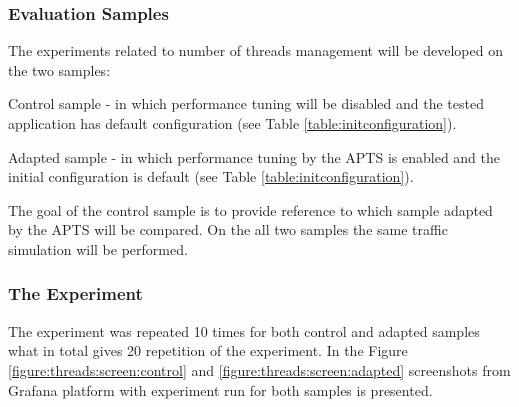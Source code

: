 \documentclass[12pt,a4paper]{article}
\let\tempone\itemize
\let\temptwo\enditemize
\renewenvironment{itemize}{\tempone\addtolength{\itemsep}{-0.4\baselineskip}}{\temptwo}
\begin{document}
 
\subsubsection{Evaluation Samples}

The experiments related to number of threads management will be developed on the two samples:
\begin{itemize}
\item Control sample - in which performance tuning will be disabled and the tested application has default  configuration (see Table \ref{table:initconfiguration}).  
\item Adapted sample - in which performance tuning by the APTS is enabled and the initial configuration is default (see Table \ref{table:initconfiguration}).
\end{itemize}

The goal of the control sample is to provide reference to which sample adapted by the APTS will be compared. On the all two samples the same traffic simulation will be performed.
 
\subsubsection{The Experiment} 

The experiment was repeated 10 times for both control and adapted samples what in total gives 20 repetition of the experiment. In the Figure \ref{figure:threads:screen:control} and \ref{figure:threads:screen:adapted} screenshots from Grafana platform with experiment run for both samples is presented.
\end{document}
